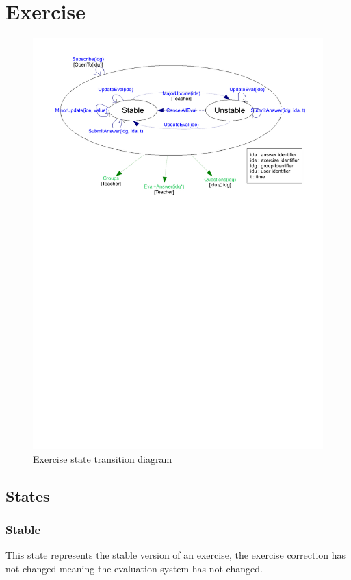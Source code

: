 \section{Exercise}
	\begin{figure}[ht]
			\begin{center}
				\includegraphics[width=\textwidth,  trim=2cm 18cm 2cm 1cm]{UML_figure/state_transition/dojo_logic/st_exercise.pdf}
				\caption{Exercise state transition diagram}
			\end{center}
	\end{figure}
	\subsection{States}
		\subsubsection{Stable}
			This state represents the stable version of an exercise, the exercise correction has not changed meaning the evaluation system has not changed.
